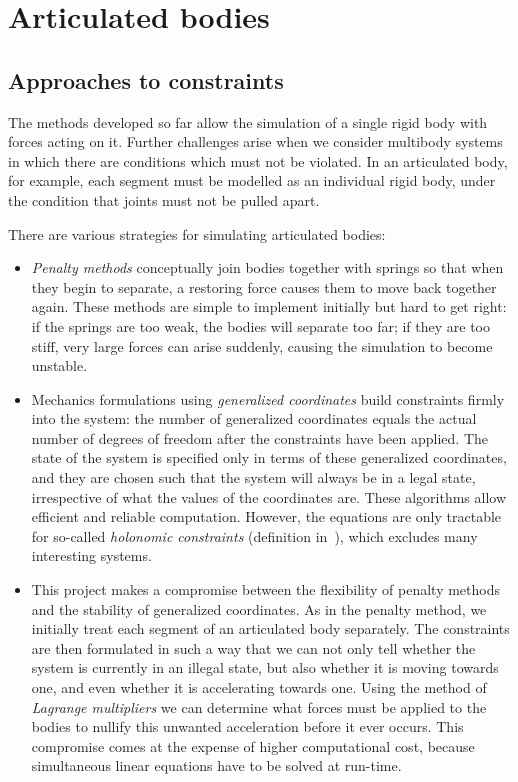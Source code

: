 \section{Articulated bodies\label{articulatedBodies}}

\subsection{Approaches to constraints\label{approachesToConstraints}}
The methods developed so far allow the simulation of a single rigid body with forces
acting on it. Further challenges arise when we consider multibody systems in which there are
conditions which must not be violated. In an articulated body, for example, each segment
must be modelled as an individual rigid body, under the condition that joints must not be pulled
apart.

There are various strategies for simulating articulated bodies:

\begin{itemize}
\item \emph{Penalty methods} conceptually join bodies together with springs so that when they
    begin to separate, a restoring force causes them to move back together again. These methods
    are simple to implement initially but hard to get right: if the springs are too weak, the
    bodies will separate too far; if they are too stiff, very large forces can arise suddenly,
    causing the simulation to become unstable.

\item Mechanics formulations using \emph{generalized coordinates}
    \cite{Hand:98,Goldstein:80,Featherstone:87,Wilhelms:91} build constraints firmly into
    the system: the number of generalized coordinates equals the actual number of degrees of
    freedom after the constraints have been applied. The state of the system is specified only in
    terms of these generalized coordinates, and they are chosen such that the system will always
    be in a legal state, irrespective of what the values of the coordinates are. These algorithms
    allow efficient and reliable computation. However, the equations are only tractable for
    so-called \emph{holonomic constraints} (definition in~\cite{Hand:98}), which excludes
    many interesting systems.

\item This project makes a compromise between the flexibility of penalty methods and the stability
    of generalized coordinates. As in the penalty method, we initially treat each segment of an
    articulated body separately. The constraints are then formulated in such a way that we can
    not only tell whether the system is currently in an illegal state, but also whether it is
    moving towards one, and even whether it is accelerating towards one. Using the method of
    \emph{Lagrange multipliers} we can determine what forces must be applied to the bodies to
    nullify this unwanted acceleration before it ever occurs. This compromise comes at the
    expense of higher computational cost, because simultaneous linear equations have to be solved
    at run-time.
\end{itemize}

